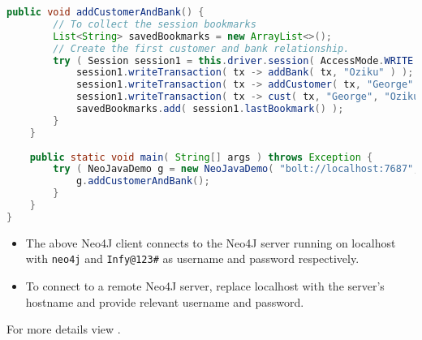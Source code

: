 \documentclass[../main.tex]{subfiles}
\begin{document}
\begin{lstlisting}[language=java, caption={Neo4J with java}]
    public void addCustomerAndBank() {
        // To collect the session bookmarks
        List<String> savedBookmarks = new ArrayList<>();
        // Create the first customer and bank relationship.
        try ( Session session1 = this.driver.session( AccessMode.WRITE ) ) {
            session1.writeTransaction( tx -> addBank( tx, "Oziku" ) );
            session1.writeTransaction( tx -> addCustomer( tx, "George" ) );
            session1.writeTransaction( tx -> cust( tx, "George", "Oziku" ) );
            savedBookmarks.add( session1.lastBookmark() );
        }
    }
    
    public static void main( String[] args ) throws Exception {
        try ( NeoJavaDemo g = new NeoJavaDemo( "bolt://localhost:7687", "neo4j", "Infy@123#" ) ) {
            g.addCustomerAndBank();
        }
    }
}
\end{lstlisting}

\begin{itemize}
	\item The above Neo4J client connects to the Neo4J server running on localhost with \lstinline{neo4j} and \lstinline{Infy@123#} as username and password respectively.
	\item To connect to a remote Neo4J server, replace localhost with the server's hostname and provide relevant username and password.
\end{itemize}

For more details view \href{https://neo4j.com/docs/driver-manual/1.7/}{\color{blue}{Neo4J Drivers}}.






\printglossaries
\end{document}

